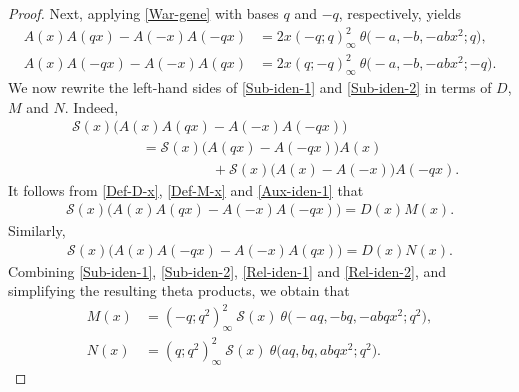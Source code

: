 \documentclass[12pt,reqno]{amsart}
\numberwithin{equation}{section}
\theoremstyle{plain}
\theoremstyle{definition}
\begin{document}
\begin{proof}
Next, applying \eqref{War-gene} with bases $q$ and $-q$, respectively, yields
\begin{align}
A(x)A(qx)-A(-x)A(-qx) &=2x(-q;q)_\infty^2\!\:\theta\big({-}a,-b,-abx^2;q\big),
\label{Sub-iden-1}\\
A(x)A(-qx)-A(-x)A(qx) &=2x(q;-q)_\infty^2\!\:\theta\big({-}a,-b,-abx^2;-q\big).
\label{Sub-iden-2}
\end{align}
We now rewrite the left-hand sides of \eqref{Sub-iden-1} and \eqref{Sub-iden-2} in
terms of $D$, $M$ and $N$. Indeed,
\begin{align}
 &\mathscr{S}(x)\big(A(x)A(qx)-A(-x)A(-qx)\big)\nonumber\\
 &\qquad\qquad\quad=\mathscr{S}(x)\big(A(qx)-A(-qx)\big)A(x)\nonumber\\
 &\qquad\qquad\qquad\qquad\qquad+\mathscr{S}(x)\big(A(x)-A(-x)\big)A(-qx).
\label{Der-step-1}
\end{align}
It follows from \eqref{Def-D-x}, \eqref{Def-M-x} and \eqref{Aux-iden-1} that
\begin{align}
\mathscr{S}(x)\big(A(x)A(qx)-A(-x)A(-qx)\big)=D(x)M(x).\label{Rel-iden-1}
\end{align}
Similarly,
\begin{align}
\mathscr{S}(x)\big(A(x)A(-qx)-A(-x)A(qx)\big)=D(x)N(x).\label{Rel-iden-2}
\end{align}
Combining \eqref{Sub-iden-1}, \eqref{Sub-iden-2}, \eqref{Rel-iden-1} and
\eqref{Rel-iden-2}, and simplifying the resulting theta products, we obtain that
\begin{align}
M(x) &=(-q;q^2)_\infty^2\!\:\mathscr{S}(x)\!\:\theta\big({-}aq,-bq,-abqx^2;q^2\big),
\label{Aux-iden-2}\\
N(x) &=(q;q^2)_\infty^2\!\:\mathscr{S}(x)\!\:\theta\big(aq,bq,abqx^2;q^2\big).
\label{Aux-iden-3}
\end{align}


\end{proof}
\end{document}
